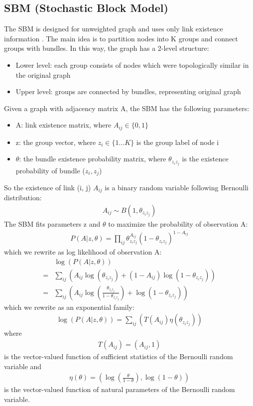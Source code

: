\documentclass[conference]{IEEEtran}
\begin{document}
\subsection{SBM (Stochastic Block Model)}
The SBM is designed for unweighted graph and uses only link existence information \cite{holland1983stochastic}.
The main idea is to partition nodes into K groups and connect groups with bundles.
In this way, the graph has a 2-level structure:
\begin{itemize}
	\item Lower level: each group consists of nodes which were topologically similar in the original graph
	\item Upper level: groups are connected by bundles, representing original graph
\end{itemize}
Given a graph with adjacency matrix A, the SBM has the following parameters:
\begin{itemize}
	\item A: link existence matrix, where $ A_{ij} \in \{0, 1\} $
	\item z: the group vector,
	where $ z_i \in \{ 1 ... K \} $ is the group label of node i
	\item $ \theta $: the bundle existence probability matrix,
	where $ \theta_{z_i z_j} $ is the existence probability of bundle ($z_i, z_j$)
\end{itemize}
So the existence of link (i, j) $ A_{ij} $ is a binary random variable following Bernoulli distribution:
\begin{align*}
	A_{ij} \sim B(1, \theta_{z_i z_j})
\end{align*}
The SBM fits parameters z and $ \theta $
to maximize the probability of observation A:
\begin{align*}
	P(A|z, \theta) 
	= \prod_{ij} \theta_{z_i z_j}^{A_{ij}}(1-\theta_{z_i z_j})^{1-A_{ij}}
\end{align*}
which we rewrite as log likelihood of observation A:
\begin{align*}
	&\log(P(A|z, \theta))\\
	=& \sum_{ij} (
	{A_{ij}} \log (\theta_{z_i z_j})
	+ (1 - {A_{ij}}) \log(1-\theta_{z_i z_j})
	)\\
	=& \sum_{ij} (
	{A_{ij}} \log (\frac{\theta_{z_i z_j}}{1-\theta_{z_i z_j}})
	+ \log(1-\theta_{z_i z_j})
	)
\end{align*}
which we rewrite as an exponential family:
\begin{align*}
	\log(P(A|z, \theta))
	= \sum_{ij} (
	T(A_{ij}) \eta(\theta_{z_i z_j})
	)
\end{align*}
where
\begin{align*}
	T(A_{ij}) = (A_{ij}, 1)
\end{align*}
is the vector-valued function of sufficient statistics of the Bernoulli random variable and
\begin{align*}
\eta(\theta) = ( \log(\frac{\theta}{1-\theta}), \log(1-\theta) )
\end{align*}
is the vector-valued function of natural parameters of the Bernoulli random variable.
\end{document}
